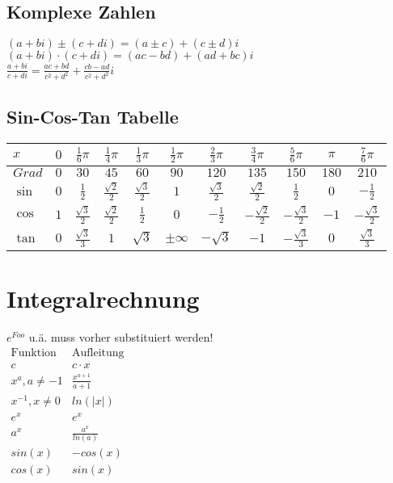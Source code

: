 \documentclass[a4paper, landscape, 10pt]{article}
\begin{document}
\begin{multicols}{5}
\begin{small}
        \subsection{Komplexe Zahlen}
        $(a + bi) \pm (c + di) = (a \pm c) + (c \pm d)i$\\
        $(a + bi) \cdot (c + di) = (ac - bd) + (ad + bc)i$\\
    
        $\displaystyle \frac{a + bi}{c + di} = \frac{ac + bd}{c^2 + d^2} + \frac{cb - ad}{c^2 + d^2}i$
	    \subsection{Sin-Cos-Tan Tabelle}
	    \begin{multicols}{2}
	    \begin{tabular}{l | c  c  c  c  c  c  c  c  c  c }
    	\noindent
    	$x$ & $0$ & $\frac{1}{6}\pi$ & $\frac{1}{4}\pi$ & $\frac{1}{3}\pi$ & $\frac{1}{2}\pi$ & $\frac{2}{3}\pi$ & $\frac{3}{4}\pi$ & $\frac{5}{6}\pi$ & $\pi$ & $\frac{7}{6}\pi$\\\hline
    	$Grad$ & $0$ & $30$ & $45$ & $60$ & $90$ & $120$ & $135$ & $150$ & $180$ & $210$\\\hline
    	$\sin$ & $0$ & $\frac{1}{2}$ & $\frac{\sqrt{2}}{2}$ & $\frac{\sqrt{3}}{2}$ & $1$ & $\frac{\sqrt{3}}{2}$ & $\frac{\sqrt{2}}{2}$ & $\frac{1}{2}$ & $0$ & $-\frac{1}{2}$\\\hline
    	$\cos$ & $1$ & $\frac{\sqrt{3}}{2}$ & $\frac{\sqrt{2}}{2}$ & $\frac{1}{2}$ & $0$ & $-\frac{1}{2}$ & $-\frac{\sqrt{2}}{2}$ & $-\frac{\sqrt{3}}{2}$ & $-1$ & $-\frac{\sqrt{3}}{2}$\\\hline
    	$\tan$ & $0$ & $\frac{\sqrt{3}}{3}$ & $1$ & $\sqrt{3}$ &$\pm\infty$ & $-\sqrt{3}$ & $-1$ & $-\frac{\sqrt{3}}{3}$ & $0$ & $\frac{\sqrt{3}}{3}$
    	\end{tabular}
        \end{multicols}
    \section{Integralrechnung}
        $e^{Foo}$ u.ä. muss vorher substituiert werden!\\
        
        $
        \begin{matrix}
        \text{Funktion} & \text{Aufleitung} \\
        c & c \cdot x \\
        x^a, a \neq -1 & \frac{x^{a+1}}{a+1}\\
        x^{-1}, x \neq 0 & ln(|x|)\\
        e^x & e^x \\
        a^x & \frac{a^x}{ln(a)} \\
        sin(x) & -cos(x)\\
        cos(x) & sin(x)
        \end{matrix}
        $

\end{small}
\end{multicols}
\end{document}
